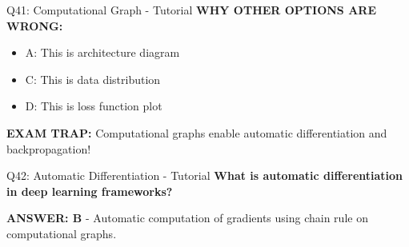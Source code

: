 \documentclass[8pt]{beamer}
\begin{document}
\begin{frame}{Q41: Computational Graph - Tutorial}
		\vspace{0.05cm}
		\textcolor{myred}{\textbf{WHY OTHER OPTIONS ARE WRONG:}}
		\begin{itemize}
			\item \textcolor{myred}{A:} This is architecture diagram
			\item \textcolor{myred}{C:} This is data distribution
			\item \textcolor{myred}{D:} This is loss function plot
		\end{itemize}
		
		\textcolor{myred}{\textbf{EXAM TRAP:}} Computational graphs enable \textcolor{myblue}{automatic differentiation} and backpropagation!
	\end{frame}
	
	\begin{frame}{Q42: Automatic Differentiation - Tutorial}
		\fontsize{6.5}{7.5}\selectfont
		\textbf{What is automatic differentiation in deep learning frameworks?}
		
		\vspace{0.05cm}
		\textcolor{myblue}{\textbf{ANSWER: B}} - Automatic computation of gradients using chain rule on computational graphs.
		

\end{frame}
\end{document}

